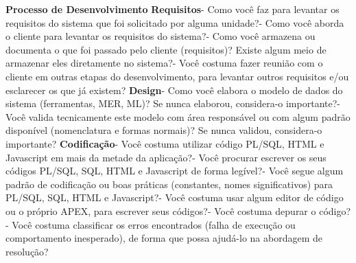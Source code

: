 \begin{anexosenv}
    \newline\newline\newline
\textbf{Processo de Desenvolvimento}\newline\newline\newline
\textbf{Requisitos}\newline{}- Como você faz para levantar os requisitos do sistema que foi solicitado por alguma unidade?- Como você aborda o cliente para levantar os requisitos do sistema?- Como você armazena ou documenta o que foi passado pelo cliente (requisitos)? Existe algum meio de armazenar eles diretamente no sistema?- Você costuma fazer reunião com o cliente em outras etapas do desenvolvimento, para levantar outros requisitos e/ou esclarecer os que já existem?\newline
    \newline
\textbf{Design}\newline{}- Como você elabora o modelo de dados do sistema (ferramentas, MER, ML)? Se nunca elaborou, considera-o importante?- Você valida tecnicamente este modelo com área responsável ou com algum padrão disponível (nomenclatura e formas normais)? Se nunca validou, considera-o importante?\newline
\newline
\textbf{Codificação}\newline{}- Você costuma utilizar código PL/SQL, HTML e Javascript em mais da metade da aplicação?- Você procurar escrever os seus códigos PL/SQL, SQL, HTML e Javascript de forma legível?- Você segue algum padrão de codificação ou boas práticas (constantes, nomes significativos) para PL/SQL, SQL, HTML e Javascript?- Você costuma usar algum editor de código ou o próprio APEX, para escrever seus códigos?- Você costuma depurar o código?- Você costuma classificar os erros encontrados (falha de execução ou comportamento inesperado), de forma que possa ajudá-lo na abordagem de resolução?\newline

\end{anexosenv}

